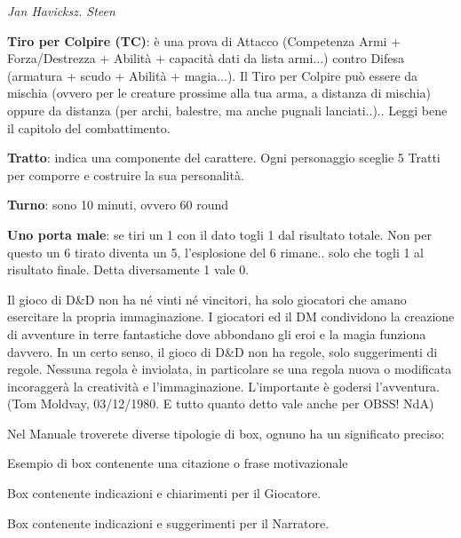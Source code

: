 \begin{multicols}{2}
\begin{center}
\emph{Jan Havicksz. Steen}
\end{center}

\textbf{Tiro per Colpire (TC)}: è una prova di Attacco (Competenza Armi + Forza/Destrezza + Abilità + capacità dati da lista armi...) contro Difesa (armatura + scudo + Abilità + magia...). Il Tiro per Colpire può essere da mischia (ovvero per le creature prossime alla tua arma, a distanza di mischia) oppure da distanza (per archi, balestre, ma anche pugnali lanciati..).. Leggi bene il capitolo del combattimento.

\textbf{Tratto}: indica una componente del carattere. Ogni personaggio sceglie 5 Tratti per comporre e costruire la sua personalità.

\textbf{Turno}: sono 10 minuti, ovvero 60 round

\textbf{Uno porta male}: se tiri un 1 con il dato togli 1 dal risultato totale. Non per questo un 6 tirato diventa un 5, l'esplosione del 6 rimane.. solo che togli 1 al risultato finale. Detta diversamente 1 vale 0.

\begin{enfasi}
Il gioco di D\&D non ha né vinti né vincitori, ha solo giocatori che amano esercitare la propria immaginazione. I giocatori ed il DM condividono la creazione di avventure in terre fantastiche dove abbondano gli eroi e la magia funziona davvero. In un certo senso, il gioco di D\&D non ha regole, solo suggerimenti di regole. Nessuna regola è inviolata, in particolare se una regola nuova o modificata incoraggerà la creatività e l'immaginazione. L'importante è godersi l'avventura. (Tom Moldvay, 03/12/1980. E tutto quanto detto vale anche per OBSS! NdA)
\end{enfasi}

\medskip

Nel Manuale troverete diverse tipologie di box, ognuno ha un significato preciso:

\medskip

\begin{enfasi}{Esempio di box contenente una citazione o frase motivazionale}\end{enfasi}

\begin{giocatore}Box contenente indicazioni e chiarimenti per il Giocatore.\end{giocatore}

\begin{narratore}Box contenente indicazioni e suggerimenti per il Narratore.\end{narratore}

\end{multicols}

